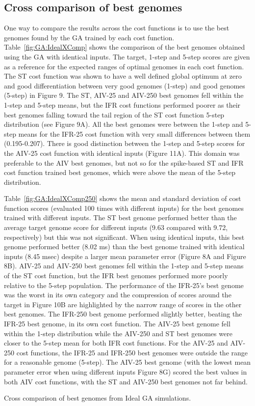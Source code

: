 \subsection{Cross comparison of best genomes}\label{sec:GA:Ideal-Xcomp-best}



One way to compare the results across the cost functions is to use the
best genomes found by the GA trained by each cost function. Table~\ref{fig:GA:IdealXComp}
shows the comparison of the best genomes obtained using the GA with
identical inputs.  The target, 1-step and 5-step scores are given as a
reference for the expected ranges of optimal genomes in each cost
function.  The ST cost function was shown to have a well defined
global optimum at zero and good differentiation between very good
genomes (1-step) and good genomes (5-step) in Figure 9.  The ST,
AIV-25 and AIV-250 best genomes fell within the 1-step and 5-step
means, but the IFR cost functions performed poorer as their best
genomes falling toward the tail region of the ST cost function 5-step
distribution (see Figure 9A).  All the best genomes were between the
1-step and 5-step means for the IFR-25 cost function with very small
differences between them (0.195-0.207).  There is good distinction
between the 1-step and 5-step scores for the AIV-25 cost function with
identical inputs (Figure 11A).  This domain was preferable to the AIV
best genomes, but not so for the spike-based ST and IFR cost function
trained best genomes, which were above the mean of the 5-step
distribution.

Table~\ref{fig:GA:IdealXComp250} shows the mean and standard deviation of cost function scores
(evaluated 100 times with different inputs) for the best genomes
trained with different inputs. The ST best genome performed better
than the average target genome score for different inputs (9.63
compared with 9.72, respectively) but this was not significant. When
using identical inputs, this best genome performed better (8.02 ms)
than the best genome trained with identical inputs (8.45 msec) despite a
larger mean parameter error (Figure 8A and Figure 8B).  AIV-25 and
AIV-250 best genomes fell within the 1-step and 5-step means of the ST
cost function, but the IFR best genomes performed more poorly relative
to the 5-step population.  The performance of the IFR-25's best genome
was the worst in its own category and the compression of scores around
the target in Figure 10B are highlighted by the narrow range of scores
in the other best genomes. The IFR-250 best genome performed slightly
better, beating the IFR-25 best genome, in its own cost function. The
AIV-25 best genome fell within the 1-step distribution while the
AIV-250 and ST best genomes were closer to the 5-step mean for both
IFR cost functions. For the AIV-25 and AIV-250 cost functions, the
IFR-25 and IFR-250 best genomes were outside the range for a
reasonable genome (5-step).  The AIV-25 best genome (with the lowest
mean parameter error when using different inputs Figure 8G) scored the
best values in both AIV cost functions, with the ST and AIV-250 best
genomes not far behind.


\begin{table}[tbh]
  \centering
%  
  \caption{Cross comparison of best genomes from Ideal GA simulations.}
  \label{tab:GA:IdealXComp}
\end{table}



